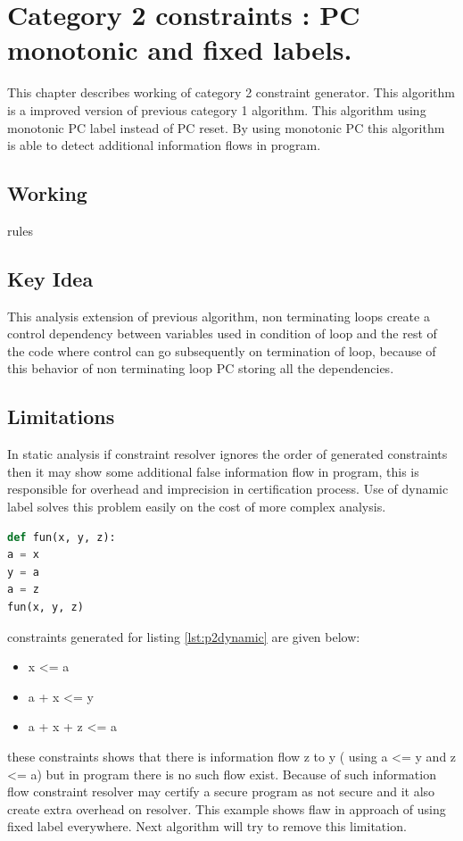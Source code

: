 \section{Category 2 constraints : PC monotonic and fixed labels.}
This chapter describes working of category 2 constraint generator. This algorithm is a improved version of previous category 1 algorithm. This algorithm using monotonic PC label instead of PC reset. By using monotonic PC this algorithm is able to detect additional information flows in program.
\subsection{Working}
rules
\subsection{Key Idea}
This analysis extension of previous algorithm, non terminating loops
create a control dependency between variables used in condition of loop and
the rest of the code where control can go subsequently on termination of loop,
because of this behavior of non terminating loop PC storing all the dependencies.

\subsection{Limitations}  
In static analysis if constraint resolver ignores the order of generated constraints then it may show some additional false information flow in program, this is responsible for overhead and imprecision in certification process. Use of dynamic label solves this problem easily on the cost of more complex analysis.
\begin{lstlisting}[language=Python, caption=Python version of dynamic label example in \cite{denning}. goal: information flow from x to y, label={lst:p2dynamic} ]
def fun(x, y, z):
a = x
y = a
a = z
fun(x, y, z)
\end{lstlisting}
constraints generated for listing \ref{lst:p2dynamic} are given below:
\begin{itemize}
	\item x <= a
	\item a + x <= y
	\item a + x + z <= a
\end{itemize}
these constraints shows that there is information flow z to y ( using a <= y and z <= a) but in program there is no such flow exist. Because of such information flow constraint resolver may certify a secure program as not secure and it also create extra overhead on resolver. This example shows flaw in approach of using fixed label everywhere. Next algorithm will try to remove this limitation.
